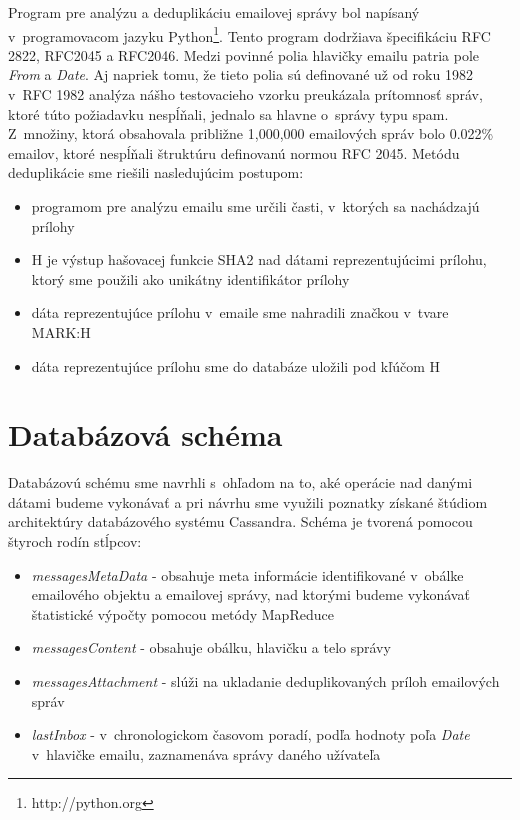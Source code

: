 \documentclass[11pt,twoside,a4paper]{book}
\begin{document}
Program pre analýzu a deduplikáciu emailovej správy bol napísaný v~programovacom jazyku Python\footnote{http://python.org}. Tento program dodržiava špecifikáciu RFC 2822, RFC2045 a RFC2046. 
Medzi povinné polia hlavičky emailu patria pole \emph{From} a \emph{Date}. Aj napriek tomu, že tieto polia sú definované už od roku 1982 v~RFC 1982 analýza nášho testovacieho vzorku preukázala prítomnosť správ, ktoré túto požiadavku nespĺňali, jednalo sa hlavne o~správy typu spam. Z~množiny, ktorá obsahovala približne 1,000,000 emailových správ bolo 0.022\% emailov, ktoré nespĺňali štruktúru definovanú normou RFC 2045. Metódu deduplikácie sme riešili nasledujúcim postupom:

\begin{itemize}
 \item programom pre analýzu emailu sme určili časti, v~ktorých sa nachádzajú prílohy
 \item H je výstup hašovacej funkcie SHA2 nad dátami reprezentujúcimi prílohu, ktorý sme použili ako unikátny identifikátor prílohy
 \item dáta reprezentujúce prílohu v~emaile sme nahradili značkou v~tvare MARK:H
 \item dáta reprezentujúce prílohu sme do databáze uložili pod kľúčom H
\end{itemize}


\section{Databázová schéma}

Databázovú schému sme navrhli s~ohľadom na to, aké operácie nad danými dátami budeme vykonávať a pri návrhu sme využili poznatky získané štúdiom architektúry databázového systému Cassandra. Schéma je tvorená pomocou štyroch rodín stĺpcov:

\begin{itemize}
 \item \emph{messagesMetaData} - obsahuje meta informácie identifikované v~obálke emailového objektu a emailovej správy, nad ktorými budeme vykonávať štatistické výpočty pomocou metódy MapReduce
 \item \emph{messagesContent} - obsahuje obálku, hlavičku a telo správy
 \item \emph{messagesAttachment} - slúži na ukladanie deduplikovaných príloh emailových správ  
 \item \emph{lastInbox} - v~chronologickom časovom poradí, podľa hodnoty poľa \emph{Date} v~hlavičke emailu, zaznamenáva správy daného užívateľa
\end{itemize}
\end{document}
